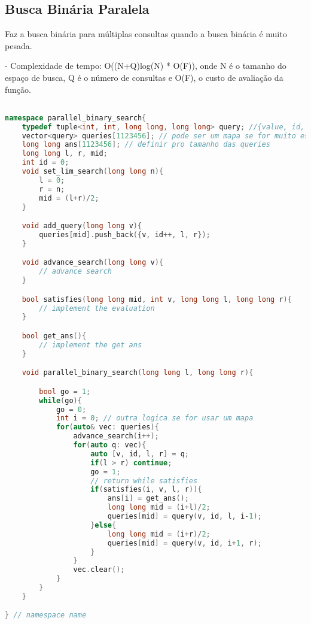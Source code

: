 \documentclass[11pt, a4paper, twoside]{article}
\begin{document}
\subsection{Busca Binária Paralela}


Faz a busca binária para múltiplas consultas quando a busca binária é muito pesada.


- Complexidade de tempo: O((N+Q)log(N) * O(F)), onde N é o tamanho do espaço de busca, Q é o número de consultas e O(F), o custo de avaliação da função.

\begin{lstlisting}[language=C++]

namespace parallel_binary_search{
    typedef tuple<int, int, long long, long long> query; //{value, id, l, r}
    vector<query> queries[1123456]; // pode ser um mapa se for muito esparso
    long long ans[1123456]; // definir pro tamanho das queries
    long long l, r, mid;
    int id = 0;
    void set_lim_search(long long n){
        l = 0;
        r = n;
        mid = (l+r)/2;
    }

    void add_query(long long v){
        queries[mid].push_back({v, id++, l, r});
    }

    void advance_search(long long v){
        // advance search
    }

    bool satisfies(long long mid, int v, long long l, long long r){
        // implement the evaluation
    }

    bool get_ans(){
        // implement the get ans
    }

    void parallel_binary_search(long long l, long long r){

        bool go = 1;
        while(go){
            go = 0;
            int i = 0; // outra logica se for usar um mapa
            for(auto& vec: queries){
                advance_search(i++);
                for(auto q: vec){
                    auto [v, id, l, r] = q;
                    if(l > r) continue;
                    go = 1;
                    // return while satisfies
                    if(satisfies(i, v, l, r)){
                        ans[i] = get_ans();
                        long long mid = (i+l)/2;
                        queries[mid] = query(v, id, l, i-1);
                    }else{
                        long long mid = (i+r)/2;
                        queries[mid] = query(v, id, i+1, r);
                    }
                }
                vec.clear();
            }
        }
    }

} // namespace name
\end{lstlisting}
\end{document}
